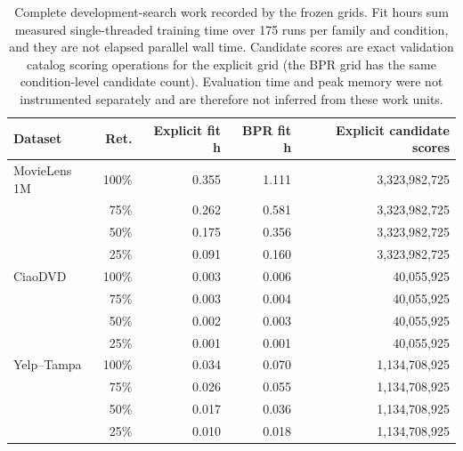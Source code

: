 \begin{table}[H]
\centering
\caption{Complete development-search work recorded by the frozen grids. Fit hours sum measured single-threaded training time over 175 runs per family and condition, and they are not elapsed parallel wall time. Candidate scores are exact validation catalog scoring operations for the explicit grid (the BPR grid has the same condition-level candidate count). Evaluation time and peak memory were not instrumented separately and are therefore not inferred from these work units.}
\label{tab:selection-cost}
\small
\begin{tabular}{@{}lrrrr@{}}
\toprule
Dataset & Ret. & Explicit fit h & BPR fit h & Explicit candidate scores \\
\midrule
MovieLens 1M & 100\% & 0.355 & 1.111 & 3,323,982,725 \\
 & 75\% & 0.262 & 0.581 & 3,323,982,725 \\
 & 50\% & 0.175 & 0.356 & 3,323,982,725 \\
 & 25\% & 0.091 & 0.160 & 3,323,982,725 \\
\addlinespace
CiaoDVD & 100\% & 0.003 & 0.006 & 40,055,925 \\
 & 75\% & 0.003 & 0.004 & 40,055,925 \\
 & 50\% & 0.002 & 0.003 & 40,055,925 \\
 & 25\% & 0.001 & 0.001 & 40,055,925 \\
\addlinespace
Yelp--Tampa & 100\% & 0.034 & 0.070 & 1,134,708,925 \\
 & 75\% & 0.026 & 0.055 & 1,134,708,925 \\
 & 50\% & 0.017 & 0.036 & 1,134,708,925 \\
 & 25\% & 0.010 & 0.018 & 1,134,708,925 \\
\bottomrule
\end{tabular}
\end{table}
